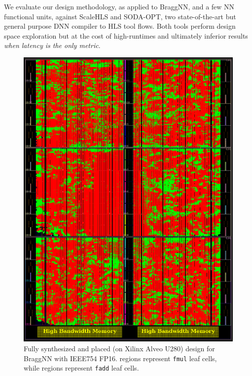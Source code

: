 We evaluate our design methodology, as applied to BraggNN, and a few NN functional units, against ScaleHLS\cite{ye2021scalehls} and SODA-OPT\cite{9516615}, two state-of-the-art but general purpose DNN compiler to HLS tool flows.
Both tools perform design space exploration but at the cost of high-runtimes and ultimately inferior results \emph{when latency is the only metric}.


\begin{figure}
	\includegraphics[width=\columnwidth]{figures/full_fpga}
	\caption{Fully synthesized and placed (on Xilinx Alveo U280) design for BraggNN with IEEE754 FP16. \crule[red]{0.25cm}{0.25cm} regions represent \texttt{fmul} leaf cells, while \crule[green]{0.25cm}{0.25cm} regions represent \texttt{fadd} leaf cells.}\label{fig:placed_braggnn}
\end{figure}

